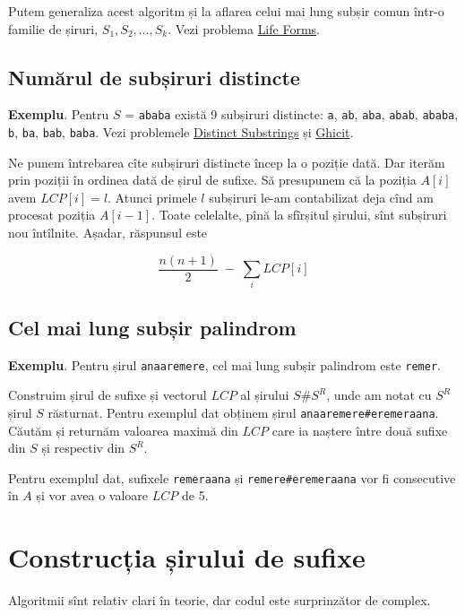 \documentclass[../main.tex]{subfiles}
\begin{document}
Putem generaliza acest algoritm și la aflarea celui mai lung subșir comun într-o familie de șiruri, $S_1, S_2, \dots, S_k$. Vezi problema \href{https://onlinejudge.org/index.php?option=com_onlinejudge\&Itemid=8\&page=show_problem\&category=0\&problem=2048}{Life Forms}.

\subsection{Numărul de subșiruri distincte}

\textbf{Exemplu}. Pentru $S$ = \texttt{ababa} există 9 subșiruri distincte: \texttt{a}, \texttt{ab}, \texttt{aba}, \texttt{abab}, \texttt{ababa}, \texttt{b}, \texttt{ba}, \texttt{bab}, \texttt{baba}. Vezi problemele \href{https://www.spoj.com/problems/DISUBSTR/}{Distinct Substrings} și \href{https://www.infoarena.ro/problema/ghicit}{Ghicit}.

Ne punem întrebarea cîte subșiruri distincte încep la o poziție dată. Dar iterăm prin poziții în ordinea dată de șirul de sufixe. Să presupunem că la poziția $A[i]$ avem $LCP[i] = l$. Atunci primele $l$ subșiruri le-am contabilizat deja cînd am procesat poziția $A[i - 1]$. Toate celelalte, pînă la sfîrșitul șirului, sînt subșiruri nou întîlnite. Așadar, răspunsul este

$$\frac{n(n + 1)}{2} \; - \; \sum_i LCP[i]$$

\subsection{Cel mai lung subșir palindrom}

\textbf{Exemplu}. Pentru șirul \texttt{anaaremere}, cel mai lung subșir palindrom este \texttt{remer}.

Construim șirul de sufixe și vectorul $LCP$ al șirului $S\#S^R$, unde am notat cu $S^R$ șirul $S$ răsturnat. Pentru exemplul dat obținem șirul \texttt{anaaremere\#eremeraana}. Căutăm și returnăm valoarea maximă din $LCP$ care ia naștere între două sufixe din $S$ și respectiv din $S^R$.

Pentru exemplul dat, sufixele \texttt{remeraana} și \texttt{remere\#eremeraana} vor fi consecutive în $A$ și vor avea o valoare $LCP$ de 5.

\section{Construcția șirului de sufixe}

Algoritmii sînt relativ clari în teorie, dar codul este surprinzător de complex.
\end{document}
